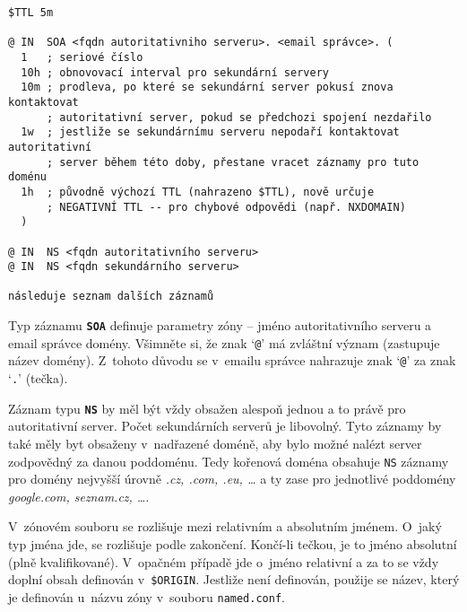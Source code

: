 \begin{verbatim}
$TTL 5m

@ IN  SOA <fqdn autoritativniho serveru>. <email správce>. (
  1   ; seriové číslo
  10h ; obnovovací interval pro sekundární servery
  10m ; prodleva, po které se sekundární server pokusí znova kontaktovat
      ; autoritativní server, pokud se předchozi spojení nezdařilo
  1w  ; jestliže se sekundárnímu serveru nepodaří kontaktovat autoritativní
      ; server během této doby, přestane vracet záznamy pro tuto doménu
  1h  ; původně výchozí TTL (nahrazeno $TTL), nově určuje
      ; NEGATIVNÍ TTL -- pro chybové odpovědi (např. NXDOMAIN)
  )

@ IN  NS <fqdn autoritativního serveru>
@ IN  NS <fqdn sekundárního serveru>

následuje seznam dalších záznamů
\end{verbatim}
Typ záznamu {\tt\bf SOA} definuje parametry zóny -- jméno autoritativního serveru a email správce domény. Všimněte si, že znak `{\tt @}' má zvláštní význam (zastupuje název domény). Z~tohoto důvodu se v~emailu správce nahrazuje znak `{\tt @}' za znak `{\tt .}' (tečka).

Záznam typu {\tt\bf NS} by měl být vždy obsažen alespoň jednou a to právě pro autoritativní server. Počet sekundárních serverů je libovolný. Tyto záznamy by také měly byt obsaženy v~nadřazené doméně, aby bylo možné nalézt server zodpovědný za danou poddoménu. Tedy kořenová doména obsahuje {\tt NS} záznamy pro domény nejvyšší úrovně {\em .cz, .com, .eu, \dots} a ty zase pro jednotlivé poddomény {\em google.com, seznam.cz, \dots}.

V~zónovém souboru se rozlišuje mezi relativním a absolutním jménem. O~jaký typ jména jde, se rozlišuje podle zakončení. Končí-li tečkou, je to jméno absolutní (plně kvalifikované). V~opačném případě jde o~jméno relativní a za to se vždy doplní obsah definován v~{\tt \$ORIGIN}. Jestliže není definován, použije se název, který je definován u~názvu zóny v~souboru {\tt named.conf}.


